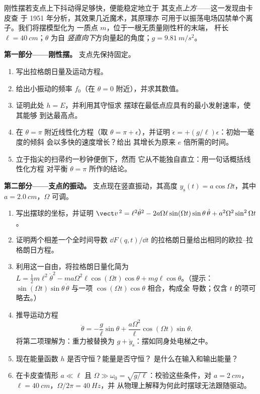 \begin{problem}\label{pb:b3:lagrangian-mechanics:1}
刚性摆若支点上下抖动得足够快，便能稳定地立于
其支点\emph{上方}——这一发现由卡皮查
于 1951 年分析，其效果几近魔术，其原理亦
可用于以振荡电场囚禁单个离子。我们将摆模型化为
一质点 $m$，位于一根无质量刚性杆的末端，
杆长 $\ell = \qty{40}{cm}$；$\theta$ 为自
\emph{竖直向下}方向量起的角度；$g = \qty{9.81}{m/s^2}$。

\medskip\noindent\textbf{第一部分——刚性摆。}
支点先保持固定。
\begin{enumerate}
  \item 写出拉格朗日量及运动方程。
  \item 给出小振动的频率 $f_0$（在 $\theta =
        0$ 附近），并求其数值。
  \item 证明此处 $h = E$，并利用其守恒求
        摆球在最低点应具有的最小发射速率，使其能够
        到达最高点。
  \item 在 $\theta = \pi$ 附近线性化方程（取 $\theta = \pi +
        \epsilon$），并证明 $\ddot\epsilon = +(g/\ell)\epsilon$：初始一毫度的倾斜
        会以多快的速度增长？给出
        其增长为原来 $e$ 倍所需的时间。
  \item 立于指尖的扫帚约一秒钟便倒下，然而
        它从不能独自直立：用一句话概括线性化方程
        对平衡 $\theta = \pi$ 所作的结论。
\end{enumerate}

\medskip\noindent\textbf{第二部分——支点的振动。}
支点现在竖直振动，其高度 $y_{\text{s}}(t) =
a\cos\Omega t$，其中 $a = \qty{2.0}{cm}$，$\Omega$ 可调。
\begin{enumerate}[resume]
  \item 写出摆球的坐标，并证明
        $\vect v^{\,2} = \ell^2\dot\theta^2 -
        2a\Omega\ell\sin(\Omega t)\sin\theta\,\dot\theta +
        a^2\Omega^2\sin^2\Omega t$。
  \item 证明两个相差一个全时间导数
        $\dd F(q,t)/\dd t$ 的拉格朗日量给出相同的欧拉–拉格朗日方程。
  \item 利用这一自由，将拉格朗日量化简为 $L = \tfrac12 m
        \ell^2\dot\theta^2 - ma\Omega^2\ell\cos(\Omega t)\cos\theta +
        mg\ell\cos\theta$。（提示：$\sin(\Omega t)\sin\theta\,\dot\theta$
        与一项 $\cos(\Omega t)\cos\theta$ 相合，构成全
        导数；仅含 $t$ 的项可略去。）
  \item 推导运动方程
        \[
        \ddot\theta = -\frac{g}{\ell}\sin\theta
         + \frac{a\Omega^2}{\ell}\cos(\Omega t)\sin\theta .
        \]
        将第二项理解为：重力被替换为 $g +
        \ddot y_{\text{s}}$：摆如同身处电梯之中。
  \item 现在能量函数 $h$ 是否守恒？能量是否守恒？
        是什么在输入和输出能量？
  \item 在卡皮查情形 $a \ll \ell$ 且 $\Omega \gg \omega_0 =
        \sqrt{g/\ell}$：校验这些条件，对 $a = \qty{2}{cm}$，$\ell =
        \qty{40}{cm}$，$\Omega/2\pi = \qty{40}{Hz}$，并
        从物理上解释为何此时摆球无法跟随驱动。
\end{enumerate}


\end{problem}
